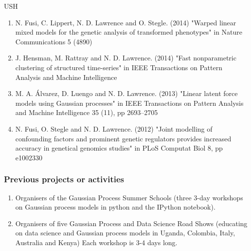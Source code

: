 \begin{sitedescription}{USH}
\begin{enumerate}
\item N. Fusi, C. Lippert, N. D. Lawrence and O. Stegle. (2014) "Warped linear mixed models for the genetic analysis of transformed phenotypes" in Nature Communications 5 (4890)
\item J. Hensman, M. Rattray and N. D. Lawrence. (2014) "Fast nonparametric clustering of structured time-series" in IEEE Transactions on Pattern Analysis and Machine Intelligence
\item M. A. \'Alvarez, D. Luengo and N. D. Lawrence. (2013) "Linear latent force models using Gaussian processes" in IEEE Transactions on Pattern Analysis and Machine Intelligence 35 (11), pp 2693--2705
\item N. Fusi, O. Stegle and N. D. Lawrence. (2012) "Joint modelling of confounding factors and prominent genetic regulators provides increased accuracy in genetical genomics studies" in PLoS Computat Biol 8, pp e1002330
\end{enumerate}

\subsubsection*{Previous projects or activities}

\begin{enumerate}
\item Organisers of the Gaussian Process Summer Schools (three 3-day workshops on Gaussian process models in python and the IPython notebook).
\item Organisers of five Gaussian Process and Data Science Road Shows (educating on data science and Gaussian process models in Uganda, Colombia, Italy, Australia and Kenya) Each workshop is 3-4 days long. 
\end{enumerate}


\end{sitedescription}
